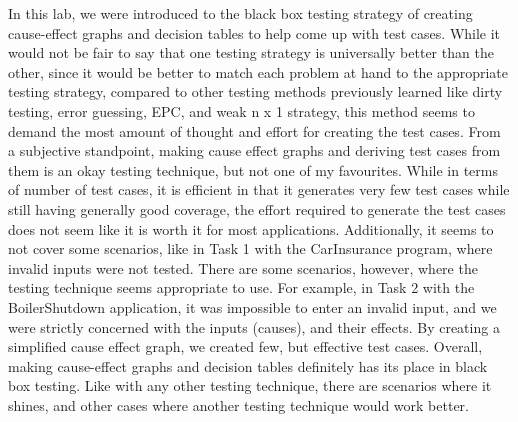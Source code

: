 In this lab, we were introduced to the black box testing strategy of creating
cause-effect graphs and decision tables to help come up with test cases.
While it would not be fair to say that one testing strategy
is universally better than the other, since it would be better to match
each problem at hand to the appropriate testing strategy, compared to other
testing methods previously learned like dirty testing, error guessing, EPC, and
weak n x 1 strategy, this method seems to demand the most amount of thought and
effort for creating the test cases.
From a subjective standpoint, making cause effect graphs and deriving test
cases from them is an okay testing technique, but not one of my favourites.
While in terms of number of test cases, it is efficient in that it generates
very few test cases while still having generally good coverage, the effort
required to generate the test cases does not seem like it is worth it for most
applications. Additionally, it seems to not cover some scenarios, like in
Task 1 with the CarInsurance program, where invalid inputs were not tested.
There are some scenarios, however, where the testing technique seems
appropriate to use. For example, in Task 2 with the BoilerShutdown application,
it was impossible to enter an invalid input, and we were strictly concerned
with the inputs (causes), and their effects. By creating a simplified
cause effect graph, we created few, but effective test cases. Overall, making
cause-effect graphs and decision tables definitely has its place in black box
testing. Like with any other testing technique, there are scenarios where it
shines, and other cases where another testing technique would work better.


